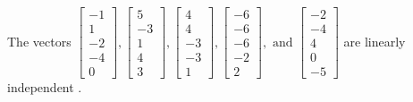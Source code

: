 \begin{exercise}
\begin{exerciseStatement}
  \end{exerciseStatement}
  \begin{exerciseAnswer}
   The vectors \(\left[\begin{array}{r}
-1 \\
1 \\
-2 \\
-4 \\
0
\end{array}\right] , \left[\begin{array}{r}
5 \\
-3 \\
1 \\
4 \\
3
\end{array}\right] , \left[\begin{array}{r}
4 \\
4 \\
-3 \\
-3 \\
1
\end{array}\right] , \left[\begin{array}{r}
-6 \\
-6 \\
-6 \\
-2 \\
2
\end{array}\right] , \text{ and } \left[\begin{array}{r}
-2 \\
-4 \\
4 \\
0 \\
-5
\end{array}\right]\) are 
  	 linearly independent  .
  


  \end{exerciseAnswer}
\end{exercise}